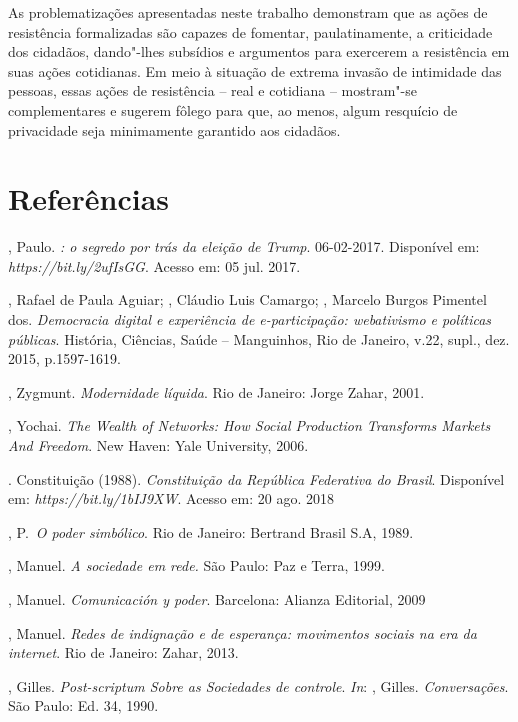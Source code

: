 As problematizações apresentadas neste trabalho demonstram que as ações
de resistência formalizadas são capazes de fomentar, paulatinamente, a
criticidade dos cidadãos, dando"-lhes subsídios e argumentos para
exercerem a resistência em suas ações cotidianas. Em meio à situação de
extrema invasão de intimidade das pessoas, essas ações de resistência --
real e cotidiana -- mostram"-se complementares e sugerem fôlego para que,
ao menos, algum resquício de privacidade seja minimamente garantido aos
cidadãos.

\section{Referências}

, Paulo. \emph{: o segredo por trás da eleição de Trump}.
06-02-2017. Disponível em: \emph{https://bit.ly/2ufIsGG}. Acesso em: 05 jul. 2017.

, Rafael de Paula Aguiar; , Cláudio Luis Camargo; ,
Marcelo Burgos Pimentel dos. \emph{Democracia digital e experiência de
e-participação: webativismo e políticas públicas}. História, Ciências,
Saúde -- Manguinhos, Rio de Janeiro, v.22, supl., dez. 2015,
p.1597-1619.

, Zygmunt. \emph{Modernidade líquida}. Rio de Janeiro: Jorge Zahar, 2001.

, Yochai. \emph{The Wealth of Networks: How Social Production
Transforms Markets And Freedom}. New Haven: Yale University, 2006.

. Constituição (1988). \emph{Constituição da República
Federativa do Brasil}. Disponível em: \emph{https://bit.ly/1bIJ9XW}. Acesso em: 20 ago. 2018

, P.~\emph{O poder simbólico}. Rio de Janeiro: Bertrand Brasil
S.A, 1989.

, Manuel. \emph{A sociedade em rede.} São Paulo: Paz e Terra,
1999.

, Manuel. \emph{Comunicación y poder}. Barcelona: Alianza
Editorial, 2009

, Manuel. \emph{Redes de indignação e de esperança:
movimentos sociais na era da internet}. Rio de Janeiro: Zahar, 2013.

, Gilles. \emph{Post-scriptum Sobre as Sociedades de controle}. \emph{In}: , Gilles. \emph{Conversações}. São Paulo: Ed. 34, 1990.

